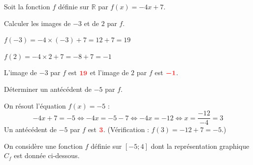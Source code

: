 \documentclass[11pt,a4paper]{article}  %
\begin{document}
\graphicspath{{images/}}

\begin{center}
\end{center}

\exerciceDS{}

Soit la fonction $f$ définie sur $\mathbb{R}$ par $f(x)=-4x+7$.
\begin{enumMet}
	\item Calculer les images de $-3$ et de $2$ par $f$.

	\begin{corrBox}
		$f(-3)=-4\times(-3)+7=12+7=19$

		$f(2)=-4\times 2+7=-8+7=-1$

		L'image de $-3$ par $f$ est $\mRouge{19}$ et l'image de $2$ par $f$ est $\mRouge{-1}$.
	\end{corrBox}

	\item Déterminer un antécédent de $-5$ par $f$.

	\begin{corrBox}
		On résout l'équation $f(x)=-5$ :
		\[-4x+7=-5 \iff -4x=-5-7 \iff -4x=-12 \iff x=\dfrac{-12}{-4}=3\]
		Un antécédent de $-5$ par $f$ est $\mRouge{3}$. \quad (Vérification : $f(3)=-12+7=-5$.)
	\end{corrBox}
\end{enumMet}

\exerciceDS{}

On considère une fonction $f$ définie sur $[-5;4]$ dont la représentation graphique $C_f$ est donnée ci-dessous.
\end{document}
